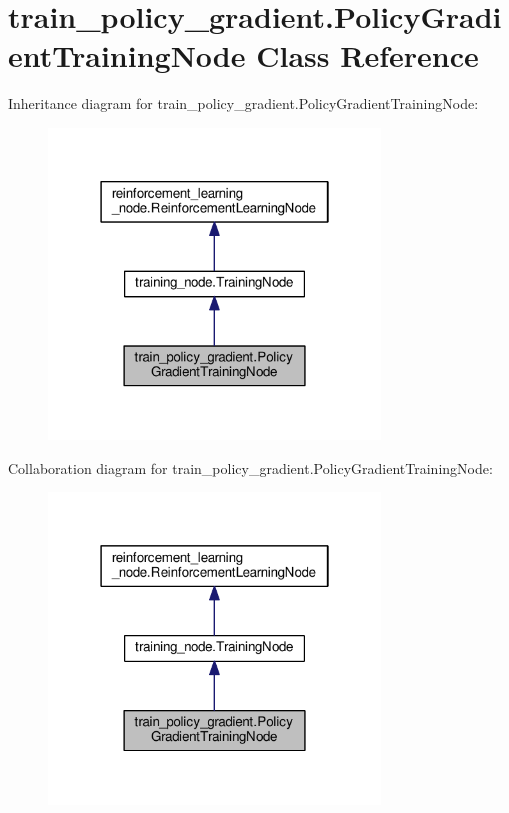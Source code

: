 \hypertarget{classtrain__policy__gradient_1_1_policy_gradient_training_node}{}\section{train\+\_\+policy\+\_\+gradient.\+Policy\+Gradient\+Training\+Node Class Reference}
\label{classtrain__policy__gradient_1_1_policy_gradient_training_node}


Inheritance diagram for train\+\_\+policy\+\_\+gradient.\+Policy\+Gradient\+Training\+Node\+:
\nopagebreak
\begin{figure}[H]
\begin{center}
\leavevmode
\includegraphics[width=250pt]{classtrain__policy__gradient_1_1_policy_gradient_training_node__inherit__graph}
\end{center}
\end{figure}


Collaboration diagram for train\+\_\+policy\+\_\+gradient.\+Policy\+Gradient\+Training\+Node\+:
\nopagebreak
\begin{figure}[H]
\begin{center}
\leavevmode
\includegraphics[width=250pt]{classtrain__policy__gradient_1_1_policy_gradient_training_node__coll__graph}
\end{center}
\end{figure}
